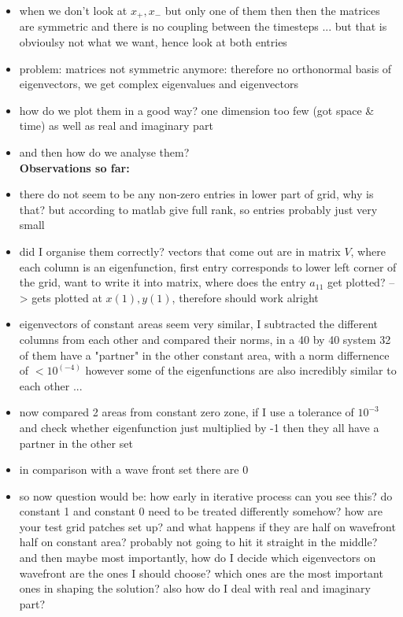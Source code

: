 \documentclass[a4paper, 11pt]{article}
\begin{document}
\begin{itemize}
	\item when we don't look at $x_+, x_-$ but only one of them then then the matrices are symmetric and there is no coupling between the timesteps ... but that is obvioulsy not what we want, hence look at both entries
	\item problem: matrices not symmetric anymore: therefore no orthonormal basis of eigenvectors, we get complex eigenvalues and eigenvectors
	\item how do we plot them in a good way? one dimension too few (got space \& time) as well as real and imaginary part 
	\item and then how do we analyse them? \\
	\textbf{Observations so far: } 
	\item there do not seem to be any non-zero entries in lower part of grid, why is that? but according to matlab give full rank, so entries probably just very small
	\item did I organise them correctly? vectors that come out are in matrix $V$, where each column is an eigenfunction, first entry corresponds to lower left corner of the grid, want to write it into matrix, where does the entry $a_{11}$ get plotted? --> gets plotted at $x(1), y(1)$, therefore should work alright
	\item eigenvectors of constant areas seem very similar, I subtracted the different columns from each other and compared their norms, in a 40 by 40 system 32 of them have a "partner" in the other constant area, with a norm differnence of $< 10^(-4)$ however some of the eigenfunctions are also incredibly similar to each other ... 
	\item now compared 2 areas from constant zero zone, if I use a tolerance of $10^{-3}$ and check whether eigenfunction just multiplied by -1 then they all have a partner in the other set
	\item in comparison with a wave front set there are 0
	\item so now question would be: how early in iterative process can you see this? do constant 1 and constant 0 need to be treated differently somehow? how are your test grid patches set up? and what happens if they are half on wavefront half on constant area? probably not going to hit it straight in the middle? and then maybe most importantly, how do I decide which eigenvectors on wavefront are the ones I should choose? which ones are the most important ones in shaping the solution? also how do I deal with real and imaginary part?
\end{itemize}
\end{document}
